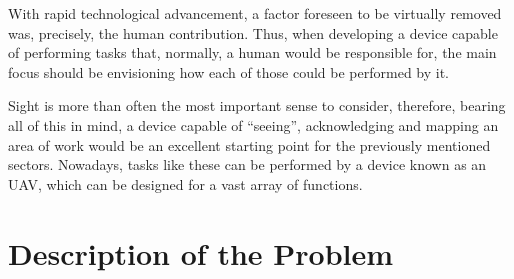 With rapid technological advancement, a factor foreseen to be virtually removed was, precisely, the human contribution. Thus, when developing a device capable of performing tasks that, normally, a human would be responsible for, the main focus should be envisioning how each of those could be performed by it.

Sight is more than often the most important sense to consider, therefore, bearing all of this in mind, a device capable of ``seeing'', acknowledging and mapping an area of work would be an excellent starting point for the previously mentioned sectors. Nowadays, tasks like these can be performed by a device known as an \gls{UAV}, which can be designed for a vast array of functions.


\section{Description of the Problem}\label{sec:I_description}



